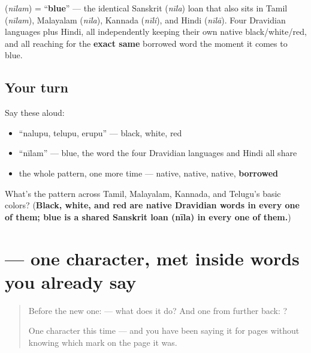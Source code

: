 \begin{cousinweb}
\textbf{} (\emph{nīlam}) = \textquotedblleft{}\textbf{blue}\textquotedblright{} — the identical Sanskrit \textbf{} (\emph{nīla}) loan that also sits in Tamil (\emph{nīlam}), Malayalam (\emph{nīla}), Kannada (\emph{nīli}), and Hindi (\emph{nīlā}). Four Dravidian languages plus Hindi, all independently keeping their own native black/white/red, and all reaching for the \textbf{exact same} borrowed word the moment it comes to blue.
\end{cousinweb}

\subsection*{Your turn}
Say these aloud:

\begin{itemize}
\raggedright
  \item \textquotedblleft{}nalupu, telupu, erupu\textquotedblright{} — black, white, red
  \item \textquotedblleft{}nīlam\textquotedblright{} — blue, the word the four Dravidian languages and Hindi all share
  \item the whole pattern, one more time — native, native, native, \textbf{borrowed}
\end{itemize}

\begin{tcolorbox}[breakable,colback=teal!4,colframe=teal!35!black,title={Before you move on}]
What's the pattern across Tamil, Malayalam, Kannada, and Telugu's basic colors? (\textbf{Black, white, and red are native Dravidian words in every one of them; blue is a shared Sanskrit loan (nīla) in every one of them.})
\end{tcolorbox}
\section[\texorpdfstring{\te{ె} (e)}{ె (e)}]{ — one character, met inside words you already say}

\label{lesson:TE-S115-vowel-sign-e}



\begin{quote}
Before the new one:  — what does it do? And one from further back: ?

One character this time — and you have been saying it for pages without knowing which mark on the page it was.
\end{quote}

